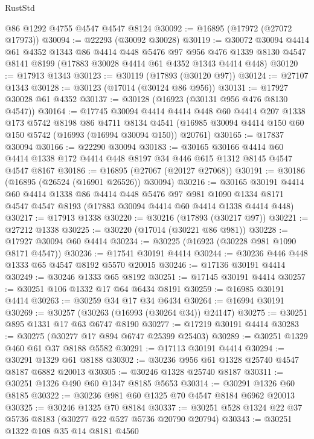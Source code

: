 \begin{lexlean}{RustStd}
\begin{coremodule}
    @86
    @1292
    @4755
    @4547
    @4547
    @8124
@30092 := @16895 (@17972 (@27072 @17973))
@30094 := @22293 (@30092 @30028)
@30119 := @30072
    @30094
    @4414
    @61
    @4352
    @1343
    @86
    @4414
    @448
    @5476
    @97
    @956
    @476
    @1339
    @8130
    @4547
    @8141
    @8199
    (@17883 @30028 @4414 @61 @4352 @1343 @4414 @448)
@30120 := @17913 @1343
@30123 := @30119 (@17893 (@30120 @97))
@30124 := @27107 @1343
@30128 := @30123 (@17014 (@30124 @86 @956))
@30131 := @17927 @30028 @61 @4352
@30137 := @30128 (@16923 (@30131 @956 @476 @8130 @4547))
@30164 := @17745
    @30094
    @4414
    @4414
    @448
    @60
    @4414
    @207
    @1338
    @173
    @5742
    @8198
    @86
    @4711
    @8134
    @4541
    (@16985 @30094 @4414 @150 @60 @150 @5742 (@16993 (@16994 @30094 @150)) @20761)
@30165 := @17837 @30094
@30166 := @22290 @30094
@30183 := @30165
    @30166
    @4414
    @60
    @4414
    @1338
    @172
    @4414
    @448
    @8197
    @34
    @446
    @615
    @1312
    @8145
    @4547
    @4547
    @8167
@30186 := @16895 (@27067 (@20127 @27068))
@30191 := @30186 (@16895 (@26524 (@16901 @26526)) @30094)
@30216 := @30165
    @30191
    @4414
    @60
    @4414
    @1338
    @86
    @4414
    @448
    @5476
    @97
    @981
    @1090
    @1334
    @8171
    @4547
    @4547
    @8193
    (@17883 @30094 @4414 @60 @4414 @1338 @4414 @448)
@30217 := @17913 @1338
@30220 := @30216 (@17893 (@30217 @97))
@30221 := @27212 @1338
@30225 := @30220 (@17014 (@30221 @86 @981))
@30228 := @17927 @30094 @60 @4414
@30234 := @30225 (@16923 (@30228 @981 @1090 @8171 @4547))
@30236 := @17541 @30191 @4414
@30244 := @30236 @446 @448 @1333 @65 @4547 @8192 @5570 @20015
@30246 := @17136 @30191 @4414
@30249 := @30246 @1333 @65 @8192
@30251 := @17145 @30191 @4414
@30257 := @30251 @106 @1332 @17 @64 @6434 @8191
@30259 := @16985 @30191 @4414
@30263 := @30259 @34 @17 @34 @6434
@30264 := @16994 @30191
@30269 := @30257 (@30263 (@16993 (@30264 @34)) @24147)
@30275 := @30251 @895 @1331 @17 @63 @6747 @8190
@30277 := @17219 @30191 @4414
@30283 := @30275 (@30277 @17 @894 @6747 @25399 @25403)
@30289 := @30251 @1329 @460 @61 @37 @8188 @5582
@30291 := @17113 @30191 @4414
@30294 := @30291 @1329 @61 @8188
@30302 := @30236 @956 @61 @1328 @25740 @4547 @8187 @6882 @20013
@30305 := @30246 @1328 @25740 @8187
@30311 := @30251 @1326 @490 @60 @1347 @8185 @5653
@30314 := @30291 @1326 @60 @8185
@30322 := @30236 @981 @60 @1325 @70 @4547 @8184 @6962 @20013
@30325 := @30246 @1325 @70 @8184
@30337 := @30251 @528 @1324 @22 @37 @5736 @8183 (@30277 @22 @527 @5736 @20790 @20794)
@30343 := @30251 @1322 @108 @35 @14 @8181 @4560

\end{coremodule}
\end{lexlean}
